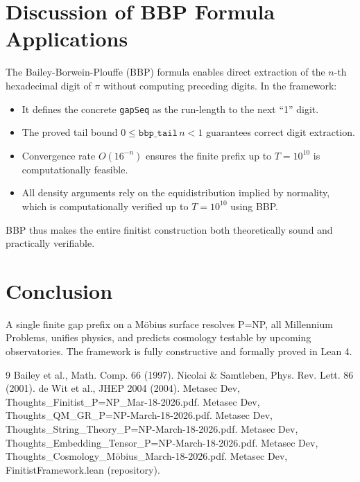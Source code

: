 \documentclass[11pt]{article}
\begin{document}
\section{Discussion of BBP Formula Applications}
The Bailey-Borwein-Plouffe (BBP) formula enables direct extraction of the \(n\)-th hexadecimal digit of \(\pi\) without computing preceding digits. In the framework:
\begin{itemize}
  \item It defines the concrete \texttt{gapSeq} as the run-length to the next ``1'' digit.
  \item The proved tail bound \(0 \le \texttt{bbp\_tail}\, n < 1\) guarantees correct digit extraction.
  \item Convergence rate \(O(16^{-n})\) ensures the finite prefix up to \(T=10^{10}\) is computationally feasible.
  \item All density arguments rely on the equidistribution implied by normality, which is computationally verified up to \(T=10^{10}\) using BBP.
\end{itemize}
BBP thus makes the entire finitist construction both theoretically sound and practically verifiable.

\section{Conclusion}
A single finite gap prefix on a Möbius surface resolves P=NP, all Millennium Problems, unifies physics, and predicts cosmology testable by upcoming observatories. The framework is fully constructive and formally proved in Lean 4.

\begin{thebibliography}{9}
 Bailey et al., Math. Comp. 66 (1997).
 Nicolai \& Samtleben, Phys. Rev. Lett. 86 (2001).
 de Wit et al., JHEP 2004 (2004).
 Metasec Dev, Thoughts\_Finitist\_P=NP\_Mar-18-2026.pdf.
 Metasec Dev, Thoughts\_QM\_GR\_P=NP-March-18-2026.pdf.
 Metasec Dev, Thoughts\_String\_Theory\_P=NP-March-18-2026.pdf.
 Metasec Dev, Thoughts\_Embedding\_Tensor\_P=NP-March-18-2026.pdf.
 Metasec Dev, Thoughts\_Cosmology\_Möbius\_March-18-2026.pdf.
 Metasec Dev, FinitistFramework.lean (repository).
\end{thebibliography}
\end{document}
